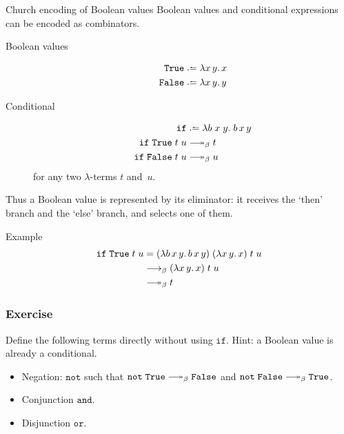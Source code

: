 \begin{frame}{Church encoding of Boolean values}
  Boolean values and conditional expressions can be encoded as combinators.

  \begin{description}
    \item[Boolean values]
      \begin{align*}
        \mathtt{True}  &\defeq \lambda x\,y.\,x \\
        \mathtt{False} &\defeq \lambda x\,y.\,y
      \end{align*}
    \item[Conditional]
      \begin{align*}
        \mathtt{if} &\defeq \lambda b\;x\;y.\; b\,x\,y \\
        \mathtt{if}\;\mathtt{True}\;t\;u &\reduce t \\
        \mathtt{if}\;\mathtt{False}\;t\;u &\reduce u
      \end{align*}
      for any two $\lambda$-terms $t$ and~$u$.
  \end{description}
  Thus a Boolean value is represented by its eliminator: it receives the
`then' branch and the `else' branch, and selects one of them.
\end{frame}

\begin{frame}{Example}
  \begin{align*}
    \mathtt{if}\;\mathtt{True}\;t\;u
    &= (\lambda b\,x\,y.\,b\,x\,y)\;(\lambda x\,y.\,x)\;t\;u \\
    &\onereduce (\lambda x\,y.\,x)\;t\;u \\
    &\reduce t
\end{align*}
\end{frame}

\begin{frame}[t]
  \frametitle{Exercise}
  Define the following terms directly without using $\mathtt{if}$.
  Hint: a Boolean value is already a conditional.  
  \begin{itemize}
    \item Negation: $\mathtt{not}$ such that $\mathtt{not}\;\mathtt{True} \reduce \mathtt{False}$ and $\mathtt{not}\;\mathtt{False} \reduce \mathtt{True}$.
    \item Conjunction $\mathtt{and}$.
    \item Disjunction $\mathtt{or}$.
  \end{itemize}
  
\end{frame}


